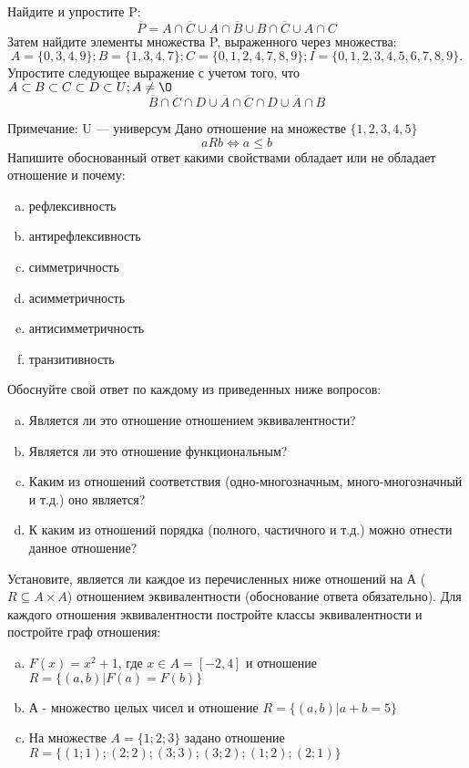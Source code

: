 \documentclass[10pt]{exam}
\begin{document}
\begin{questions}
\question
Найдите и упростите P:
\begin{equation*}
\overline{P} = A \cap \overline{C} \cup A \cap \overline{B} \cup B \cap \overline{C} \cup A \cap C
\end{equation*}
Затем найдите элементы множества P, выраженного через множества:
\begin{equation*}
A = \{0, 3, 4, 9\}; 
B = \{1, 3, 4, 7\};
C = \{0, 1, 2, 4, 7, 8, 9\};
I = \{0, 1, 2, 3, 4, 5, 6, 7, 8, 9\}.
\end{equation*}\question
Упростите следующее выражение с учетом того, что $A\subset B \subset C \subset D \subset U; A \neq \O$
\begin{equation*}
\overline{B} \cap \overline{C} \cap D \cup \overline{A} \cap \overline{C} \cap D \cup \overline{A} \cap B
\end{equation*}

Примечание: U — универсум\question
Дано отношение на множестве $\{1, 2, 3, 4, 5\}$ 
\begin{equation*}
aRb \iff a \leq b
\end{equation*}
Напишите обоснованный ответ какими свойствами обладает или не обладает отношение и почему:   
\begin{enumerate} [a)]\setcounter{enumi}{0}
\item рефлексивность
\item антирефлексивность
\item симметричность
\item асимметричность
\item антисимметричность
\item транзитивность
\end{enumerate}

Обоснуйте свой ответ по каждому из приведенных ниже вопросов:
\begin{enumerate} [a)]\setcounter{enumi}{0}
    \item Является ли это отношение отношением эквивалентности?
    \item Является ли это отношение функциональным?
    \item Каким из отношений соответствия (одно-многозначным, много-многозначный и т.д.) оно является?
    \item К каким из отношений порядка (полного, частичного и т.д.) можно отнести данное отношение?
\end{enumerate}


\question
Установите, является ли каждое из перечисленных ниже отношений на А ($R \subseteq A \times A$) отношением эквивалентности (обоснование ответа обязательно). Для каждого отношения эквивалентности постройте классы эквивалентности и постройте граф отношения:
\begin{enumerate} [a)]\setcounter{enumi}{0}
\item $F(x)=x^{2}+1$, где $x \in A = [-2, 4]$ и отношение $R = \{(a,b)|F(a) = F(b)\}$
\item А - множество целых чисел и отношение $R = \{(a,b)|a + b = 5\}$
\item На множестве $A = \{1; 2; 3\}$ задано отношение $R = \{(1; 1); (2; 2); (3; 3); (3; 2); (1; 2); (2; 1)\}$


\end{enumerate}
\end{questions}
\end{document}
